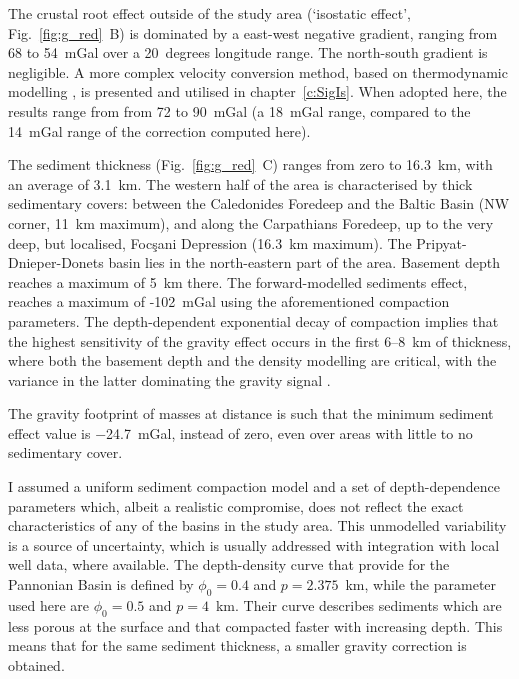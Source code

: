 The crustal root effect outside of the study area (`isostatic effect', Fig.~\ref{fig:g_red}~B) is dominated by a east-west negative gradient, ranging from \num{68} to \SI{54}{mGal} over a 20~degrees longitude range.
The north-south gradient is negligible.
A more complex velocity conversion method, based on thermodynamic modelling \parencite{Connolly2005}, is presented and utilised in chapter~\ref{c:SigIs}.
When adopted here, the results range from from \num{72} to \SI{90}{mGal} (a \SI{18}{mGal} range, compared to the \SI{14}{mGal} range of the correction computed here).

The sediment thickness (Fig.~\ref{fig:g_red}~C) ranges from zero to 16.3~\si{\kilo \metre}, with an average of 3.1~\si{\kilo \metre}.
The western half of the area is characterised by thick sedimentary covers: between the Caledonides Foredeep and the Baltic Basin (NW corner, 11~\si{\kilo \metre} maximum), and along the Carpathians Foredeep, up to the very deep, but localised, Focşani Depression (16.3~\si{\kilo \metre} maximum).
The Pripyat-Dnieper-Donets basin lies in the north-eastern part of the area.
Basement depth reaches a maximum of 5~\si{\kilo \metre} there.
The forward-modelled sediments effect, reaches a maximum of -102~mGal using the aforementioned compaction parameters.
The depth-dependent exponential decay of compaction implies that the highest sensitivity of the gravity effect occurs in the first 6--8~\si{\kilo \metre} of thickness, where both the basement depth and the density modelling are critical, with the variance in the latter dominating the gravity signal \parencite{Kaban2010}.

The gravity footprint of masses at distance is such that the minimum sediment effect value is \SI{-24.7}{mGal}, instead of zero, even over areas with little to no sedimentary cover.

I assumed a uniform sediment compaction model and a set of depth-dependence parameters which, albeit a realistic compromise, does not reflect the exact characteristics of any of the basins in the study area.
This unmodelled variability is a source of uncertainty, which is usually addressed with integration with local well data, where available.
The depth-density curve that \textcite{Kaban2010} provide for the Pannonian Basin is defined by $\phi_0 = 0.4$ and $p = 2.375$~{km}, while the parameter used here are $\phi_0 = 0.5$ and $p = 4$~{km}.
Their \parencite{Kaban2010} curve describes sediments which are less porous at the surface and that compacted faster with increasing depth.
This means that for the same sediment thickness, a smaller gravity correction is obtained.

